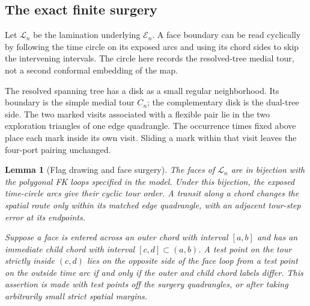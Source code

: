 \documentclass[11pt]{article}
\numberwithin{equation}{section}
\newtheorem{lemma}[theorem]{Lemma}
\theoremstyle{definition}
\theoremstyle{remark}
\newcommand{\1}{\mathbf 1}
\begin{document}
\subsection{The exact finite surgery}

Let $\mathcal L_n$ be the lamination underlying $\mathcal E_n$.  A face
boundary can be read cyclically by following the time circle on its
exposed arcs and using its chord sides to skip the intervening intervals.
The circle here records the resolved-tree medial tour, not a second
conformal embedding of the map.

The resolved spanning tree has a disk as a small regular neighborhood.
Its boundary is the simple medial tour $C_n$; the complementary disk
is the dual-tree side.  The two marked visits associated with a flexible
pair lie in the two exploration triangles of one edge quadrangle.
The occurrence times fixed above place each mark inside its own visit.
Sliding a mark within that visit leaves the four-port pairing unchanged.

\begin{lemma}[Flag drawing and face surgery]\label{loop:surgery}
The faces of $\mathcal L_n$ are in bijection with the polygonal FK loops
specified in the model.  Under this bijection, the exposed time-circle
arcs give their cyclic tour order.  A transit along a chord changes the
spatial route only within its matched edge quadrangle, with an adjacent
tour-step error at its endpoints.

Suppose a face is entered across an outer chord with interval $[a,b]$ and
has an immediate child chord with interval $[c,d]\subset(a,b)$.  A test
point on the tour strictly inside $(c,d)$ lies on the opposite side of the
face loop from a test point on the outside time arc if and only if the
outer and child chord labels differ.  This assertion is made with test
points off the surgery quadrangles, or after taking arbitrarily small
strict spatial margins.
\end{lemma}
\end{document}
